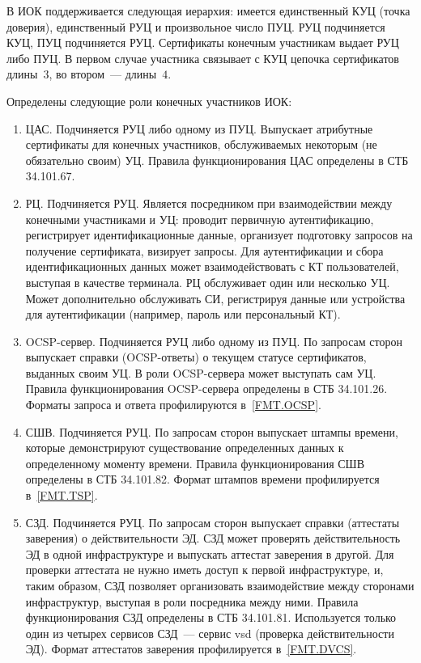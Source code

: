В ИОК поддерживается следующая иерархия: 
имеется единственный КУЦ (точка доверия), единственный РУЦ и
произвольное число ПУЦ. РУЦ подчиняется КУЦ, ПУЦ подчиняется РУЦ. 
Сертификаты конечным участникам выдает РУЦ либо ПУЦ.
%
В первом случае участника связывает с КУЦ цепочка сертификатов длины~$3$,
во втором~--- длины~$4$.

Определены следующие роли конечных участников ИОК:
\begin{enumerate}
\item
ЦАС. Подчиняется РУЦ либо одному из ПУЦ. 
Выпускает атрибутные сертификаты для 
конечных участников, обслуживаемых некоторым (не обязательно своим) УЦ.
Правила функционирования ЦАС определены в СТБ 34.101.67.

\item
РЦ. Подчиняется РУЦ.
Является посредником при взаимодействии между конечными участниками и УЦ:
проводит первичную аутентификацию, регистрирует идентификационные данные,
организует подготовку запросов на получение сертификата, визирует запросы. 
%
Для аутентификации и сбора идентификационных данных может 
взаимодействовать с КТ пользователей, выступая в качестве терминала. 
%  
РЦ обслуживает один или несколько УЦ. Может дополнительно 
обслуживать СИ, регистрируя данные или устройства для аутентификации 
(например, пароль или персональный КТ). 

\item
OCSP-сервер. Подчиняется РУЦ либо одному из ПУЦ.
По запросам сторон выпускает справки (OCSP-ответы)
о текущем статусе сертификатов, выданных своим УЦ. 
В роли OCSP-сервера может выступать сам УЦ.
Правила функционирования OCSP-сервера определены в СТБ 34.101.26.
%
Форматы запроса и ответа профилируются в~\ref{FMT.OCSP}.

\item
СШВ. Подчиняется РУЦ.
По запросам сторон выпускает штампы времени, которые демонстрируют 
существование определенных данных к определенному моменту времени. 
Правила функционирования СШВ определены в СТБ 34.101.82.
%
Формат штампов времени профилируется в~\ref{FMT.TSP}.

\item
СЗД. Подчиняется РУЦ.
По запросам сторон выпускает справки (аттестаты заверения)
о действительности ЭД. 
%
СЗД может проверять действительность ЭД в одной инфраструктуре и 
выпускать аттестат заверения в другой. Для проверки аттестата не нужно 
иметь доступ к первой инфраструктуре, и, таким образом, СЗД позволяет 
организовать взаимодействие между сторонами инфраструктур, выступая в роли 
посредника между ними. 
%
Правила функционирования СЗД определены в СТБ 34.101.81.
Используется только один из четырех сервисов СЗД~---
сервис vsd (проверка действительности ЭД).
%
Формат аттестатов заверения профилируется в~\ref{FMT.DVCS}.


\end{enumerate}
